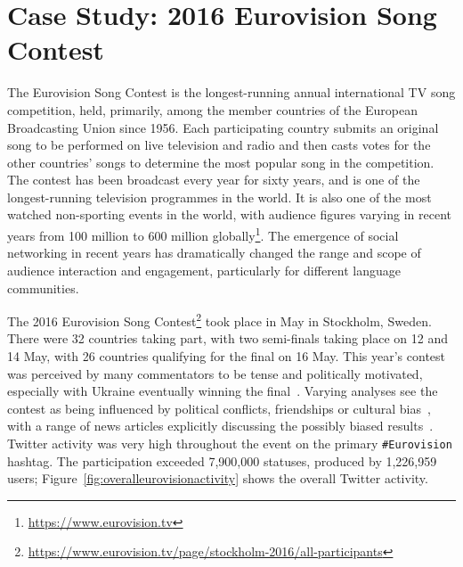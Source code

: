 \documentclass{llncs}
\begin{document}


\section{Case Study: 2016 Eurovision Song Contest}\label{eurovisioncasestudy}

The Eurovision Song Contest is the longest-running annual
international TV song competition, held, primarily, among the member
countries of the European Broadcasting Union since 1956. Each
participating country submits an original song to be performed on live
television and radio and then casts votes for the other countries'
songs to determine the most popular song in the competition. The
contest has been broadcast every year for sixty years, and is one of
the longest-running television programmes in the world. It is also one
of the most watched non-sporting events in the world, with audience
figures varying in recent years from 100 million to 600 million
globally\footnote{\url{https://www.eurovision.tv}}. The emergence of
social networking in recent years has dramatically changed the range
and scope of audience interaction and engagement, particularly for
different language communities.

The 2016 Eurovision Song
Contest\footnote{\url{https://www.eurovision.tv/page/stockholm-2016/all-participants}}
took place in May in Stockholm, Sweden. There were 32 countries taking
part, with two semi-finals taking place on 12 and 14 May, with 26
countries qualifying for the final on 16 May. This year's contest was
perceived by many commentators to be tense and politically motivated,
especially with Ukraine eventually winning the
final~\cite{telegrapheuroboycott:2016}. Varying analyses see the
contest as being influenced by political conflicts, friendships or
cultural
bias~\cite{ginsburgh+noury:2008,charron:2013,blangiardo+baio:2014,budzinski+pannicke:2016},
with a range of news articles explicitly discussing the possibly
biased results~\cite{telegrapheurobias:2016}.  Twitter activity was
very high throughout the event on the primary {\texttt{\#Eurovision}}
hashtag. The participation exceeded 7,900,000 statuses, produced by
1,226,959 users; Figure~\ref{fig:overalleurovisionactivity} shows the
overall Twitter activity.
\end{document}
